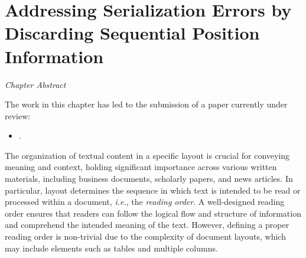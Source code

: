 
\chapter{Addressing Serialization Errors by Discarding Sequential Position Information}
\label{chapter:layout2pos}

\renewcommand{\leftmark}{\spacedlowsmallcaps{Addressing Serialization Errors by Discarding Sequential Position Information}}

\begin{chapabstract}
    {\em
    Chapter Abstract


    \vspace*{5mm}
    The work in this chapter has led to the submission of a paper currently under review:}
    \begin{itemize}
        \item \small \fullcite{}.
    \end{itemize}
\end{chapabstract}



\newpage

\minitoc
{}


The organization of textual content in a specific layout is crucial for conveying meaning and context, holding significant importance across various written materials, including business documents, scholarly papers, and news articles. In particular, layout determines the sequence in which text is intended to be read or processed within a document, \textit{i.e.}, the \textit{reading order}. A well-designed reading order ensures that readers can follow the logical flow and structure of information and comprehend the intended meaning of the text. However, defining a proper reading order is non-trivial due to the complexity of document layouts, which may include elements such as tables and multiple columns.

